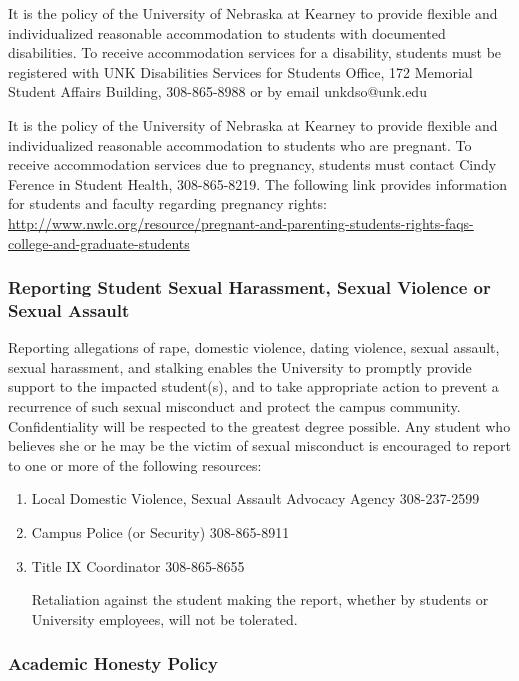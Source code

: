 \documentclass[12pt,fullpage]{article}
\newcounter{ex}\setcounter{ex}{0}
\begin{document}
It is the policy of the University of Nebraska at Kearney to provide flexible and individualized reasonable accommodation to students with documented disabilities. To receive accommodation services for a disability, students must be registered with UNK Disabilities Services for Students Office, 172 Memorial Student Affairs Building, 308-865-8988 or by email unkdso@unk.edu


It is the policy of the University of Nebraska at Kearney to provide flexible and individualized reasonable accommodation to students who are pregnant. To receive accommodation services due to pregnancy, students must contact Cindy Ference in Student Health, 308-865-8219. The following link provides information for students and faculty regarding pregnancy rights:  \small \url{ http://www.nwlc.org/resource/pregnant-and-parenting-students-rights-faqs-college-and-graduate-students} \normalsize 

\subsubsection*{Reporting Student Sexual Harassment, Sexual Violence or Sexual Assault}


Reporting allegations of rape, domestic violence, dating violence, sexual assault, sexual harassment, and stalking enables the University to promptly provide support to the impacted student(s), and to take appropriate action to prevent a recurrence of such sexual misconduct and protect the campus community. Confidentiality will be respected to the greatest degree possible. Any student who believes she or he may be the victim of sexual misconduct is encouraged to report to one or more of the following resources:

\begin{enumerate}

\item Local Domestic Violence, Sexual Assault Advocacy Agency 308-237-2599

\item Campus Police (or Security) 308-865-8911

\item Title IX Coordinator 308-865-8655

Retaliation against the student making the report, whether by students or University employees, will not be tolerated.

\end{enumerate}

\subsubsection*{Academic Honesty Policy}
\end{document}
